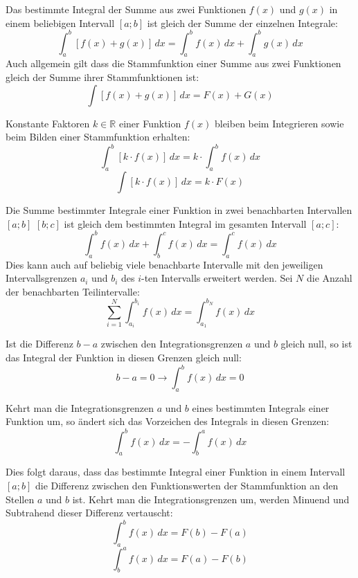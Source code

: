 \begin{itemize}

	Das bestimmte Integral der Summe aus zwei Funktionen $f(x)$ und $g(x)$ in einem beliebigen Intervall $[a ; b]$ ist gleich der Summe der einzelnen Integrale: $$\int_a^b [f(x) + g(x)] \,dx = \int_a^b f(x) \, dx + \int_a^b g(x) \, dx$$ Auch allgemein gilt dass die Stammfunktion einer Summe aus zwei Funktionen gleich der Summe ihrer Stammfunktionen ist: $$\int [f(x) + g(x)]\,dx = F(x) + G(x)$$


	Konstante Faktoren $k \in \mathbb{R}$ einer Funktion $f(x)$ bleiben beim Integrieren sowie beim Bilden einer Stammfunktion erhalten: $$\int_a^b [k \cdot f(x)] \, dx = k \cdot \int_a^b f(x) \, dx$$ $$\int [k \cdot f(x)] \, dx = k \cdot F(x)$$


	Die Summe bestimmter Integrale einer Funktion in zwei benachbarten Intervallen $[a ; b]$ $[b ; c]$ ist gleich dem bestimmten Integral im gesamten Intervall $[a ; c]$: $$\int_a^b f(x) \, dx + \int_b^c f(x) \, dx = \int_a^c f(x)\, dx$$ Dies kann auch auf beliebig viele benachbarte Intervalle mit den jeweiligen Intervallsgrenzen $a_i$ und $b_i$ des $i$-ten Intervalls erweitert werden. Sei $N$ die Anzahl der benachbarten Teilintervalle: $$\sum_{i=1}^{N} \int_{a_i}^{b_i} f(x) \, dx = \int_{a_1}^{b_N} f(x) \, dx$$


	Ist die Differenz $b - a$ zwischen den Integrationsgrenzen $a$ und $b$ gleich null, so ist das Integral der Funktion in diesen Grenzen gleich null: $$b - a = 0 \rightarrow \int_{a}^{b} f(x) \, dx = 0$$


	Kehrt man die Integrationsgrenzen $a$ und $b$ eines bestimmten Integrals einer Funktion um, so \"{a}ndert sich das Vorzeichen des Integrals in diesen Grenzen: $$\int_a^b f(x) \, dx = -\int_b^a f(x) \, dx$$

	Dies folgt daraus, dass das bestimmte Integral einer Funktion in einem Intervall $[a ; b]$ die Differenz zwischen den Funktionswerten der Stammfunktion an den Stellen $a$ und $b$ ist. Kehrt man die Integrationsgrenzen um, werden Minuend und Subtrahend dieser Differenz vertauscht: $$\int_a^b f(x) \, dx = F(b) - F(a)$$ $$\int_b^a f(x) \, dx = F(a) - F(b)$$

\end{itemize}

